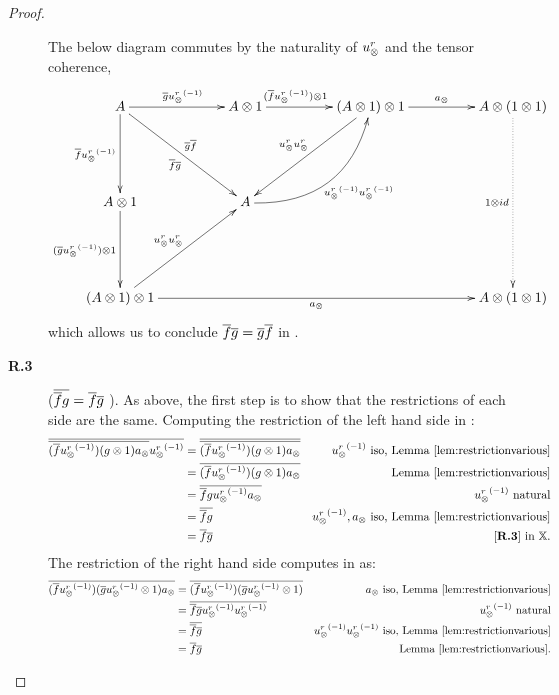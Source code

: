 \begin{proof}
\begin{description}

      The below diagram commutes by the naturality of $u_{\otimes}^r$ and the tensor coherence,
      \[
        \xymatrix @C=48pt @R=55pt{
          A \ar[r]^{\restr{g} \inv{\usr}}
            \ar[dr]_{\restr{f}\restr{g}}^{\restr{g}\restr{f}}
            \ar[d]_{\restr{f}\inv{\usr}}
            &A\*1 \ar[r]^(.4){(\rst{f}\inv{\usr})\*1}
            & (A \*1) \* 1
            \ar[r]^{a_{\*}}  \ar[dl]_{\usr \usr}
            & A \* (1\*1) \ar@{.>}[dd]_{1\*id}\\ %
          A\*1 \ar[d]_{(\rst{g}\inv{\usr})\*1}
            &A \ar@/_25pt/[ur]_{\inv{\usr}\inv{\usr}} \\
          (A\*1)\*1 \ar[rrr]_{a_\*} \ar[ur]^{\usr \usr}
            &&& A \* (1\*1)
        }
      \]
      which allows us to conclude $\overline{f} \overline{g} = \overline{g} \overline{f}$ in \Xt.



    \item[\textbf{R.3}] ($\overline{\overline{f} g} = \overline{f} \overline{g}$ ). As above, the first step is
      to show that the restrictions of each side are the same. Computing the restriction of the left
      hand side in \X:
      \begin{align*}
        \rst{\restr{(\restr{f} \inv{\usr}) (g\* 1) a_{\*}} \inv{\usr}}
        & = \rst{\restr{(\restr{f} \inv{\usr}) (g\* 1) a_{\*}}} & \inv{\usr}
          \text{ iso, Lemma \ref{lem:restrictionvarious}}\\
        & = \restr{(\restr{f} \inv{\usr}) (g\* 1) a_{\*}} &
          \text{Lemma \ref{lem:restrictionvarious}}\\
        & = \restr{\restr{f} g \inv{\usr} a_{\*}} & \inv{\usr} \text{ natural}\\
        & = \restr{\restr{f} g } & \inv{\usr}, a_{\*}
          \text{ iso, Lemma \ref{lem:restrictionvarious}}\\
        & = \restr{f} \rst{g} & \text{\rthree in }\X.
      \end{align*}
      The restriction of the right hand side computes in \X as:
      \begin{align*}
        \overline{(\overline{f} {u_{\otimes}^r}^{(-1)}) (\overline{g} {u_{\otimes}^r}^{(-1)}\otimes 1) a_{\otimes}}
        & = \overline{(\overline{f} {u_{\otimes}^r}^{(-1)}) (\overline{g} {u_{\otimes}^r}^{(-1)}\otimes 1) } &  a_{\otimes}
          \text{ iso, Lemma \ref{lem:restrictionvarious}}\\
        & = \overline{\overline{f}  \overline{g} {u_{\otimes}^r}^{(-1)}{u_{\otimes}^r}^{(-1)} } &  {u_{\otimes}^r}^{(-1)} \text{ natural}\\
        & = \overline{\overline{f}  \overline{g} } &{u_{\otimes}^r}^{(-1)}{u_{\otimes}^r}^{(-1)}
          \text{ iso, Lemma \ref{lem:restrictionvarious}}\\
        & = \overline{f} \overline{g} & \text{Lemma \ref{lem:restrictionvarious}}.
      \end{align*}


\end{description}
\end{proof}
